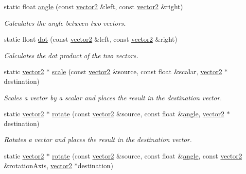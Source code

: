 \begin{DoxyCompactItemize}
static float \hyperlink{classflounder_1_1vector2_ab4f5590e810ff8caa0a56e314622570f}{angle} (const \hyperlink{classflounder_1_1vector2}{vector2} \&left, const \hyperlink{classflounder_1_1vector2}{vector2} \&right)
\begin{DoxyCompactList}\small\item\em Calculates the angle between two vectors. \end{DoxyCompactList}\item 
static float \hyperlink{classflounder_1_1vector2_aa31bd71d70aedce42212ebaba5ea3e57}{dot} (const \hyperlink{classflounder_1_1vector2}{vector2} \&left, const \hyperlink{classflounder_1_1vector2}{vector2} \&right)
\begin{DoxyCompactList}\small\item\em Calculates the dot product of the two vectors. \end{DoxyCompactList}\item 
static \hyperlink{classflounder_1_1vector2}{vector2} $\ast$ \hyperlink{classflounder_1_1vector2_a36b6e7c522b629e3e8aaedfb361d9e0e}{scale} (const \hyperlink{classflounder_1_1vector2}{vector2} \&source, const float \&scalar, \hyperlink{classflounder_1_1vector2}{vector2} $\ast$destination)
\begin{DoxyCompactList}\small\item\em Scales a vector by a scalar and places the result in the destination vector. \end{DoxyCompactList}\item 
static \hyperlink{classflounder_1_1vector2}{vector2} $\ast$ \hyperlink{classflounder_1_1vector2_a3f1f3b79aceda6ee53eb87d57919eacb}{rotate} (const \hyperlink{classflounder_1_1vector2}{vector2} \&source, const float \&\hyperlink{classflounder_1_1vector2_ab4f5590e810ff8caa0a56e314622570f}{angle}, \hyperlink{classflounder_1_1vector2}{vector2} $\ast$destination)
\begin{DoxyCompactList}\small\item\em Rotates a vector and places the result in the destination vector. \end{DoxyCompactList}\item 
static \hyperlink{classflounder_1_1vector2}{vector2} $\ast$ \hyperlink{classflounder_1_1vector2_a29746bc6beaf18110249a0ccc6899bad}{rotate} (const \hyperlink{classflounder_1_1vector2}{vector2} \&source, const float \&\hyperlink{classflounder_1_1vector2_ab4f5590e810ff8caa0a56e314622570f}{angle}, const \hyperlink{classflounder_1_1vector2}{vector2} \&rotation\+Axis, \hyperlink{classflounder_1_1vector2}{vector2} $\ast$destination)

\end{DoxyCompactItemize}

